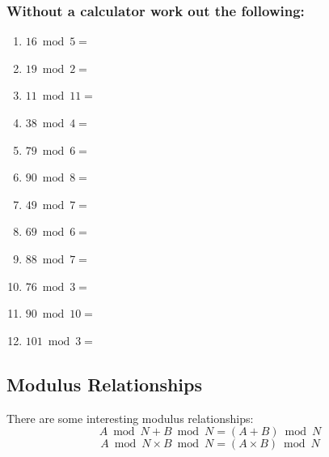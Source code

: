 \documentclass[a4paper,12pt]{article}
\begin{document}
\subsubsection{Without a calculator work out the following:}
\begin{center}
\begin{multicols}{2}
\begin{enumerate}[label= \roman*)]
\item $16 \bmod 5 = $\\
\item $19 \bmod 2 = $\\
\item $11 \bmod 11 = $\\
\item $38 \bmod 4 = $\\
\item $79 \bmod 6 = $\\
\item $90 \bmod 8 = $\\
\item $49 \bmod 7 = $\\
\item $69 \bmod 6 = $\\
\item $88 \bmod 7 = $\\
\item $76 \bmod 3 = $\\
\item $90 \bmod 10 = $\\
\item $101 \bmod 3 = $\\
\end{enumerate}
\end{multicols}
\end{center}
\newpage
\subsection{Modulus Relationships}
There are some interesting modulus relationships:
$$A \bmod N + B \bmod N = (A+B) \bmod N$$
$$A \bmod N \times B \bmod N = (A \times B) \bmod N$$
\end{document}
